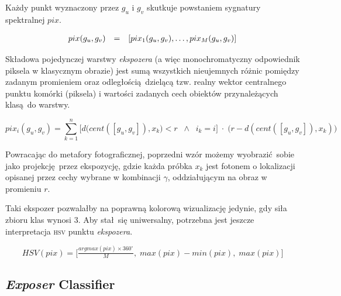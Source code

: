 \documentclass[]{article}
\begin{document}
Każdy punkt wyznaczony przez $g_u$ i $g_v$ skutkuje powstaniem sygnatury spektralnej $pix$.

\begin{equation}
	\begin{array}[b]{lll}
		pix(g_u,g_v) &=& [pix_1(g_u,g_v), \ldots, pix_M(g_u,g_v)]
	\end{array}
\end{equation}

Składowa pojedynczej warstwy \emph{ekspozera} (a więc monochromatyczny odpowiednik piksela w klasycznym obrazie) jest sumą wszystkich nieujemnych różnic pomiędzy zadanym promieniem oraz odległością dzielącą tzw. realny wektor centralnego punktu komórki (piksela) i wartości zadanych cech obiektów przynależących klasą do warstwy.



\begin{equation}
	pix_i(g_u,g_v) = \sum_{k=1}^{n}\Big[d\Big(cent([g_u,g_v]),x_k\Big) < r \;\;\wedge\;\; i_k = i\Big]\;\cdot\; \Big(r - d(cent([g_u,g_v]),x_k)\Big)
\end{equation}

Powracając do metafory fotograficznej, poprzedni wzór możemy wyobrazić sobie jako projekcję przez ekspozycję, gdzie każda próbka $x_k$ jest fotonem o lokalizacji opisanej przez cechy wybrane w kombinacji $\gamma$, oddziałującym na obraz w promieniu $r$.

Taki ekspozer pozwalałby na poprawną kolorową wizualizację jedynie, gdy siła zbioru klas wynosi 3. Aby stał się uniwersalny, potrzebna jest jeszcze interpretacja \textsc{hsv} punktu \emph{ekspozera}.

\begin{equation}
	HSV(pix) = \Big[\tfrac{argmax(pix) \times 360^\circ}{M},\;max(pix) - min(pix),\;max(pix)\Big] 
\end{equation}


\subsection{\emph{Exposer} Classifier}
\label{exposerclassifier}
\end{document}
